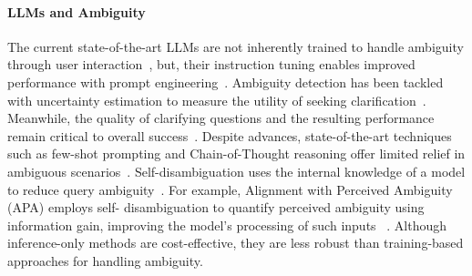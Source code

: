 \paragraph{LLMs and Ambiguity}
The current state-of-the-art LLMs
are not inherently trained to handle ambiguity through
user interaction~\cite{zhang2024clamberbenchmarkidentifyingclarifying}, but, their instruction
tuning enables improved performance with prompt engineering~\cite{white2023prompt}. Ambiguity detection has been
tackled with uncertainty estimation to measure the utility
of seeking clarification~\cite{zhang2023clarifynecessaryresolvingambiguity, park2024claraclassifyingdisambiguatinguser}. Meanwhile, the quality of clarifying questions and
the resulting performance remain critical to overall success~\cite{learning-good-questions, clarifydelphi, kuhn2023clamselectiveclarificationambiguous}. Despite advances, state-of-the-art techniques such as few-shot prompting and Chain-of-Thought
reasoning offer limited relief in ambiguous scenarios~\cite{zhang2024clamberbenchmarkidentifyingclarifying}. Self-disambiguation uses the internal knowledge of a
model to reduce query ambiguity~\cite{keluskar2024llmsunderstandambiguitytext,sterner2022explaining,sumanathilaka2024llmsassistambiguityquantitative}. For example,
Alignment with Perceived Ambiguity (APA) employs self-
disambiguation to quantify perceived ambiguity using information gain, improving the model’s processing of such
inputs ~\cite{kim2024aligninglanguagemodelsexplicitly}. Although inference-only
methods are cost-effective, they are less robust than training-based approaches for handling ambiguity.